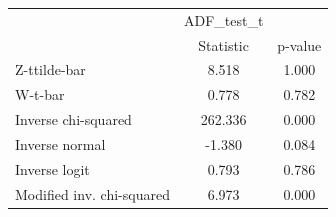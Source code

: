 \begin{tabular}{l*{2}{c}}
\hline\hline
            &  ADF\_test\_t&            \\
            &   Statistic&     p-value\\
\hline
Z-ttilde-bar&       8.518&       1.000\\
W-t-bar     &       0.778&       0.782\\
Inverse chi-squared&     262.336&       0.000\\
Inverse normal&      -1.380&       0.084\\
Inverse logit&       0.793&       0.786\\
Modified inv. chi-squared&       6.973&       0.000\\
\hline\hline
\end{tabular}

